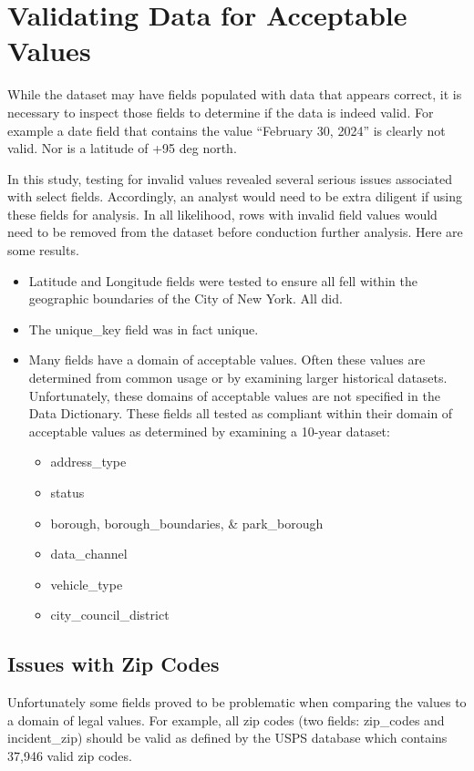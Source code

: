 \documentclass[12pt, titlepage]{article}
\begin{document}
 \section{Validating Data for Acceptable Values}\label{sec:domain}
 While the dataset may have fields populated with data that appears correct, 
 it is necessary to inspect those fields to determine if the data is indeed valid. 
 For example a date field that contains the value ``February 30, 2024'' is 
 clearly not valid. Nor is a latitude of +95 deg north. 
 
 In this study, testing for invalid values revealed several serious issues 
 associated with select fields. Accordingly, an analyst would need to be 
 extra diligent if using these fields for analysis. In all likelihood, 
 rows with invalid field values would  need to be removed from the 
 dataset before conduction further analysis. Here are some results.

\begin{itemize}
	\item Latitude and Longitude fields were tested to ensure all fell 
	within the geographic boundaries of the City of New York. All did.
	\item The unique\_key field was in fact unique.
	\item Many fields have a domain of acceptable values. Often these 
	values are determined from common usage or by examining
	larger historical datasets. Unfortunately, these domains of acceptable 
	values are not specified in the Data Dictionary. These fields all tested as 
	compliant within their domain of acceptable values as determined by 
	examining a 10-year dataset:
	\begin{itemize}
		\item address\_type
		\item status
		\item borough, borough\_boundaries, \& park\_borough 
		\item data\_channel
		\item vehicle\_type
		\item city\_council\_district
	\end{itemize}	
\end{itemize}

\subsection{Issues with Zip Codes}
\label{sec:zipcodesissues}
	 Unfortunately some fields proved to be  problematic when comparing 
	 the values to a domain of legal values. For example, all zip codes 
	 (two fields: zip\_codes and incident\_zip) should be valid as defined 
	 by the USPS database which contains 37,946 valid zip codes.
	 
\end{document}
